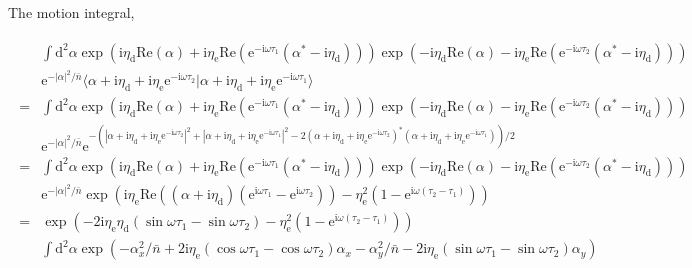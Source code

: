 \documentclass[10pt,fleqn]{article}
\newcommand{\ud}{\mathrm{d}}
\newcommand{\ue}{\mathrm{e}}
\newcommand{\ui}{\mathrm{i}}
\newcommand{\eqar}[1]
{
  \begin{align}
    #1
  \end{align}
}
\newcommand{\paren}[1]{{\left({#1}\right)}}
\newcommand{\abs}[1]{{\left|{#1}\right|}}
\begin{document}
The motion integral,
\eqar{
  \begin{split}
    &\int\ud^2\alpha
      \exp\paren{\ui\eta_{\mathrm{d}}\mathrm{Re}(\alpha)+\ui\eta_{\mathrm{e}}\mathrm{Re}(\ue^{-\ui\omega\tau_{1}}(\alpha^*-\ui\eta_{\mathrm{d}}))}
      \exp\paren{-\ui\eta_{\mathrm{d}}\mathrm{Re}(\alpha)-\ui\eta_{\mathrm{e}}\mathrm{Re}(\ue^{-\ui\omega\tau_{2}}(\alpha^*-\ui\eta_{\mathrm{d}}))}\\
    &\ue^{-\abs{\alpha}^2/{\bar n}}\langle\alpha+\ui\eta_{\mathrm{d}}+\ui\eta_{\mathrm{e}}\ue^{-\ui\omega\tau_{2}}|\alpha+\ui\eta_{\mathrm{d}}+\ui\eta_{\mathrm{e}}\ue^{-\ui\omega\tau_{1}}\rangle\\
    =&\int\ud^2\alpha
       \exp\paren{\ui\eta_{\mathrm{d}}\mathrm{Re}(\alpha)+\ui\eta_{\mathrm{e}}\mathrm{Re}(\ue^{-\ui\omega\tau_{1}}(\alpha^*-\ui\eta_{\mathrm{d}}))}
       \exp\paren{-\ui\eta_{\mathrm{d}}\mathrm{Re}(\alpha)-\ui\eta_{\mathrm{e}}\mathrm{Re}(\ue^{-\ui\omega\tau_{2}}(\alpha^*-\ui\eta_{\mathrm{d}}))}\\
    &\ue^{-\abs{\alpha}^2/{\bar n}}
      \ue^{-\paren{\abs{\alpha+\ui\eta_{\mathrm{d}}+\ui\eta_{\mathrm{e}}\ue^{-\ui\omega\tau_{2}}}^2+\abs{\alpha+\ui\eta_{\mathrm{d}}+\ui\eta_{\mathrm{e}}\ue^{-\ui\omega\tau_{1}}}^2-2\paren{\alpha+\ui\eta_{\mathrm{d}}+\ui\eta_{\mathrm{e}}\ue^{-\ui\omega\tau_{2}}}^*\paren{\alpha+\ui\eta_{\mathrm{d}}+\ui\eta_{\mathrm{e}}\ue^{-\ui\omega\tau_{1}}}}/2}\\
    =&\int\ud^2\alpha
       \exp\paren{\ui\eta_{\mathrm{d}}\mathrm{Re}(\alpha)+\ui\eta_{\mathrm{e}}\mathrm{Re}(\ue^{-\ui\omega\tau_{1}}(\alpha^*-\ui\eta_{\mathrm{d}}))}
       \exp\paren{-\ui\eta_{\mathrm{d}}\mathrm{Re}(\alpha)-\ui\eta_{\mathrm{e}}\mathrm{Re}(\ue^{-\ui\omega\tau_{2}}(\alpha^*-\ui\eta_{\mathrm{d}}))}\\
    &\ue^{-\abs{\alpha}^2/{\bar n}}
      \exp\paren{
      \ui\eta_{\mathrm{e}}\mathrm{Re}\paren{\paren{\alpha+\ui\eta_{\mathrm{d}}}
      \paren{\ue^{\ui\omega\tau_{1}}-\ue^{\ui\omega\tau_{2}}}}
      -\eta_{\mathrm{e}}^2\paren{1-\ue^{\ui\omega\paren{\tau_{2}-\tau_{1}}}}
      }\\
    =&\exp\paren{
       -2\ui\eta_{\mathrm{e}}
       \eta_{\mathrm{d}}\paren{\sin\omega\tau_{1}-\sin\omega\tau_{2}}
       -\eta_{\mathrm{e}}^2\paren{1-\ue^{\ui\omega\paren{\tau_{2}-\tau_{1}}}}
       }\\
    &\int\ud^2\alpha
      \exp\paren{
      -\alpha_x^2/{\bar n}
      +2\ui\eta_{\mathrm{e}}\paren{\cos\omega\tau_{1}-\cos\omega\tau_{2}}\alpha_x
      -\alpha_y^2/{\bar n}
      -2\ui\eta_{\mathrm{e}}\paren{\sin\omega\tau_{1}-\sin\omega\tau_{2}}\alpha_y
}
\end{split}}
\end{document}
